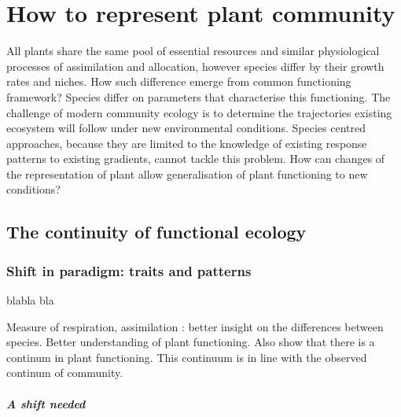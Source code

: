  

\chapter{How to represent plant community}

All plants share the same pool of essential resources and similar physiological processes of assimilation and allocation, however species differ by their growth rates and niches. How such difference emerge  from common functioning framework? Species differ on parameters that characterise this functioning. The challenge of modern community ecology is to determine the trajectories existing ecosystem will follow under new environmental conditions. Species centred approaches, because they are limited to the knowledge of existing response patterns to existing gradients, cannot tackle this 
problem. How can changes of the representation of plant allow generalisation of plant functioning to new conditions?

\section{The continuity of functional ecology}

\subsection{Shift in paradigm: traits and patterns}
 blabla bla 

Measure of respiration, assimilation : better insight on the differences between species. Better understanding of plant functioning. Also show that there is a continum in plant functioning. This continuum is in line with the observed continum of community.

\paragraph{A shift needed}

